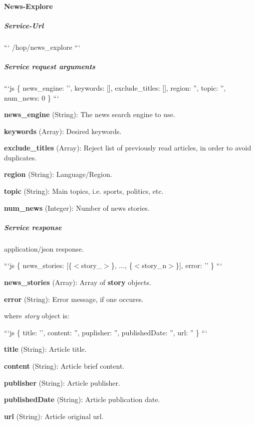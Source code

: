 \paragraph*{News-\/\-Explore}

\subparagraph*{Service-\/\-Url}

``` /hop/news\-\_\-explore ```

\subparagraph*{Service request arguments}

```js \{ news\-\_\-engine\-: '', keywords\-: \mbox{[}\mbox{]}, exclude\-\_\-titles\-: \mbox{[}\mbox{]}, region\-: '', topic\-: '', num\-\_\-news\-: 0 \} ```


\begin{DoxyItemize}
\item {\bfseries news\-\_\-engine} (String)\-: The news search engine to use.
\item {\bfseries keywords} (Array)\-: Desired keywords.
\item {\bfseries exclude\-\_\-titles} (Array)\-: Reject list of previously read articles, in order to avoid duplicates.
\item {\bfseries region} (String)\-: Language/\-Region.
\item {\bfseries topic} (String)\-: Main topics, i.\-e. sports, politics, etc.
\item {\bfseries num\-\_\-news} (Integer)\-: Number of news stories.
\end{DoxyItemize}

\subparagraph*{Service response}

application/json response.

```js \{ news\-\_\-stories\-: \mbox{[}\{$<$story\-\_$>$\}, ..., \{$<$story\-\_\-n$>$\}\mbox{]}, error\-: '' \} ```


\begin{DoxyItemize}
\item {\bfseries news\-\_\-stories} (Array)\-: Array of {\bfseries story} objects.
\item {\bfseries error} (String)\-: Error message, if one occures.
\end{DoxyItemize}

where {\itshape story} object is\-:

```js \{ title\-: '', content\-: '', puplisher\-: '', published\-Date\-: '', url\-: '' \} ```


\begin{DoxyItemize}
\item {\bfseries title} (String)\-: Article title.
\item {\bfseries content} (String)\-: Article brief content.
\item {\bfseries publisher} (String)\-: Article publisher.
\item {\bfseries published\-Date} (String)\-: Article publication date.
\item {\bfseries url} (String)\-: Article original url. 
\end{DoxyItemize}